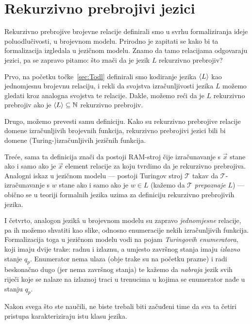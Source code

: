 \section{Rekurzivno prebrojivi jezici}\label{sec:relang}

Rekurzivno prebrojive brojevne relacije definirali smo u svrhu formaliziranja ideje poluodlučivosti, u brojevnom modelu. Prirodno je zapitati se kako bi ta formalizacija izgledala u jezičnom modelu. Znamo da tamo relacijama odgovaraju jezici, pa se zapravo pitamo: što znači da je jezik $L$ rekurzivno prebrojiv?

Prvo, na početku točke~\ref{sec:Todl} definirali smo kodiranje jezika $\langle L\rangle$ kao jednomjesnu brojevnu relaciju, i rekli da svojstva izračunljivosti jezika $L$ možemo gledati kroz analogna svojstva te relacije. Dakle, možemo reći da je $L$ rekurzivno prebrojiv ako je $\langle L\rangle\subseteq{\mathbb N}$ rekurzivno prebrojiv.

Drugo, možemo prevesti samu definiciju. Kako su rekurzivno prebrojive relacije domene izračunljivih brojevnih funkcija, rekurzivno prebrojivi jezici bili bi domene (Turing-)izračunljivih jezičnih funkcija.

Treće, sama ta definicija znači da postoji RAM-stroj čije izračunavanje s $\vec x$ stane ako i samo ako je $\vec x$ element relacije za koju tvrdimo da je rekurzivno prebrojiva. Analogni iskaz u jezičnom modelu --- postoji Turingov stroj $\mathcal T$ takav da $\mathcal T$\!-izračunavanje s $w$ stane ako i samo ako je $w\in L$ (kažemo da $\mathcal T$\! \emph{prepoznaje} $L$) --- obično se u teoriji formalnih jezika uzima za definiciju rekurzivno prebrojivih jezika.

I četvrto, analogon jezik\^a u brojevnom modelu su zapravo \emph{jednomjesne} relacije, pa ih možemo shvatiti kao slike, odnosno enumeracije nekih izračunljivih funkcija. Formalizacija toga u jezičnom modelu vodi na pojam \emph{Turingovih enumeratora}, koji imaju dvije trake: radnu i izlaznu, a umjesto završnog stanja imaju \emph{izlazno} stanje $q_p$. Enumerator nema ulaza (obje trake su na početku prazne) i radi beskonačno dugo (jer nema završnog stanja) te kažemo da \emph{nabraja} jezik svih riječi koje se nalaze na izlaznoj traci u trenucima u kojima se enumerator nađe u stanju $q_p$.

Nakon svega što ste naučili, ne biste trebali biti začuđeni time da sva ta četiri pristupa karakteriziraju istu klasu jezika.

